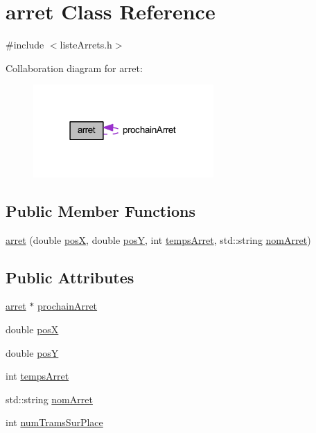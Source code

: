 \hypertarget{classarret}{}\section{arret Class Reference}
\label{classarret}


{\ttfamily \#include $<$liste\+Arrets.\+h$>$}



Collaboration diagram for arret\+:
\nopagebreak
\begin{figure}[H]
\begin{center}
\leavevmode
\includegraphics[width=195pt]{classarret__coll__graph}
\end{center}
\end{figure}
\subsection*{Public Member Functions}
\begin{DoxyCompactItemize}
\item 
\hyperlink{classarret_ae38cddedd9355eeaebbafe40bcb4b0bc}{arret} (double \hyperlink{classarret_a10d9c6ad4411da3b31072f04633745d1}{posX}, double \hyperlink{classarret_a87be7e932dbc73b03ba64969c1413faa}{posY}, int \hyperlink{classarret_afc7a6e7cb0cb73e242a4c6ad8743995c}{temps\+Arret}, std\+::string \hyperlink{classarret_a543d7100f999b9f0267945bf44c67d4b}{nom\+Arret})
\end{DoxyCompactItemize}
\subsection*{Public Attributes}
\begin{DoxyCompactItemize}
\item 
\hyperlink{classarret}{arret} $\ast$ \hyperlink{classarret_a69ca61ad6399a414b15a2bcc1cc4a81c}{prochain\+Arret}
\item 
double \hyperlink{classarret_a10d9c6ad4411da3b31072f04633745d1}{posX}
\item 
double \hyperlink{classarret_a87be7e932dbc73b03ba64969c1413faa}{posY}
\item 
int \hyperlink{classarret_afc7a6e7cb0cb73e242a4c6ad8743995c}{temps\+Arret}
\item 
std\+::string \hyperlink{classarret_a543d7100f999b9f0267945bf44c67d4b}{nom\+Arret}
\item 
int \hyperlink{classarret_aff9a2ea0c2261ea5ea0c04e5b84880bb}{num\+Trams\+Sur\+Place}
\end{DoxyCompactItemize}
